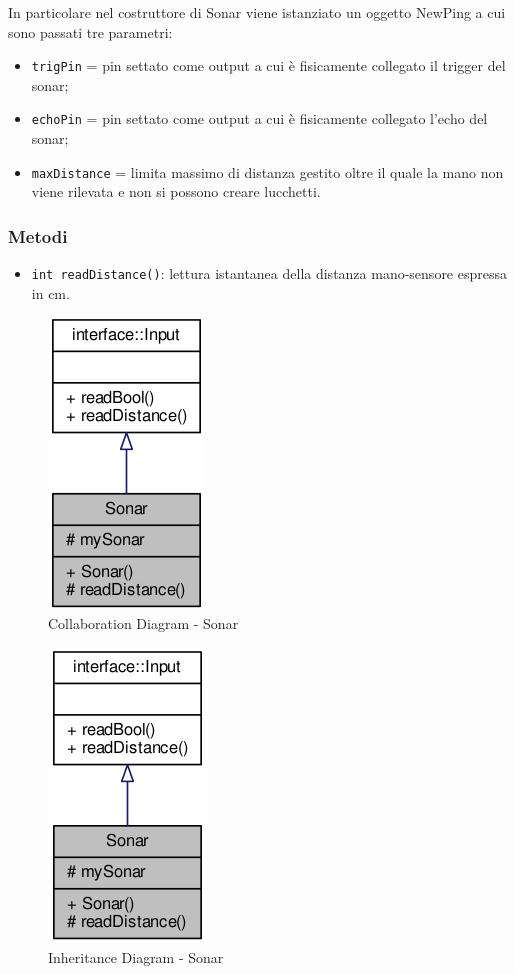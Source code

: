 In particolare nel costruttore di Sonar viene istanziato un oggetto NewPing a cui sono passati tre parametri:
\begin{itemize}
	\item \texttt{trigPin} = pin settato come output a cui è fisicamente collegato il trigger del sonar;
	\item \texttt{echoPin} = pin settato come output a cui è fisicamente collegato l'echo del sonar;
	\item \texttt{maxDistance} = limita massimo di distanza gestito oltre il quale la mano non viene rilevata e non si possono creare lucchetti.
\end{itemize}
\subsubsection{Metodi}
\begin{itemize}
	\item \texttt{int readDistance()}: lettura istantanea della distanza mano-sensore espressa in cm.
\end{itemize}
\begin{figure}[!ht]
	\centering
	\includegraphics[scale=.5]{img/UML/CollaborationDiagram/Sonar.png}
	\caption{Collaboration Diagram - Sonar}
\end{figure}
\begin{figure}[!ht]
	\centering
	\includegraphics[scale=.5]{img/UML/InheritanceDiagram/Sonar.png}
	\caption{Inheritance Diagram - Sonar}
\end{figure}

